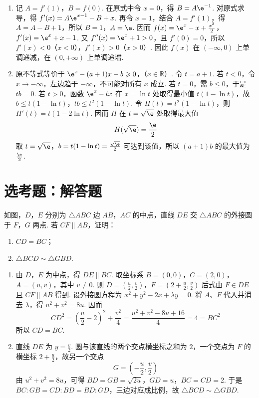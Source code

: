\begin{solution}
\begin{enumerate}
\item 记 \(A=f'(1)\)，\(B=f(0)\). 在原式中令 \(x=0\)，得 \(B=A\e^{-1}\). 对原式求导，得 \(f'(x)=A\e^{x-1}-B+x\). 再令 \(x=1\)，结合 \(A=f'(1)\)，得 \(A=A-B+1\)，所以 \(B=1\)，\(A=\e\). 因而
\(f(x)=\e^x-x+\frac{x^2}{2}\)，\(f'(x)=\e^x+x-1\).
又 \(f''(x)=\e^x+1>0\)，且 \(f'(0)=0\)，所以 \(f'(x)<0\)（\(x<0\)），\(f'(x)>0\)（\(x>0\)）. 因此 \(f(x)\) 在 \((-\infty,0)\) 上单调递减，在 \((0,+\infty)\) 上单调递增.
\item 原不等式等价于
\(\e^x-(a+1)x-b\geqslant0\)，（\(x\in\mathbb R\)）.
令 \(t=a+1\). 若 \(t<0\)，令 \(x\to-\infty\)，左边趋于 \(-\infty\)，不可能对所有 \(x\) 成立. 若 \(t=0\)，需 \(b\leqslant0\)，于是 \(tb=0\). 若 \(t>0\)，函数 \(\e^x-tx\) 在 \(x=\ln t\) 处取得最小值 \(t(1-\ln t)\)，故
\(b\leqslant t(1-\ln t)\)，\(tb\leqslant t^2(1-\ln t)\).
令 \(H(t)=t^2(1-\ln t)\)，则 \(H'(t)=t(1-2\ln t)\). 因而 \(H\) 在 \(t=\sqrt{\e}\) 处取得最大值
\[
H(\sqrt{\e})=\frac{\e}{2}
\]
取 \(t=\sqrt{\e}\)，\(b=t(1-\ln t)=\frac{\sqrt{\e}}2\) 可达到该值，所以 \((a+1)b\) 的最大值为 \(\frac{\e}{2}\).
\end{enumerate}
\end{solution}

\section{选考题：解答题}

\begin{problem}
如图，\(D\)，\(E\) 分别为 \(\triangle ABC\) 边 \(AB\)，\(AC\) 的中点，直线 \(DE\) 交 \(\triangle ABC\) 的外接圆于 \(F\)，\(G\) 两点. 若 \(CF \parallel AB\)，证明：

\begin{enumerate}
\item \(CD = BC\)；
\item \(\triangle BCD \sim \triangle GBD\).
\end{enumerate}
\end{problem}

\begin{solution}
\begin{enumerate}
\item 由 \(D\)，\(E\) 为中点，得 \(DE\parallel BC\). 取坐标系 \(B=(0,0)\)，\(C=(2,0)\)，\(A=(u,v)\)，其中 \(v\ne0\). 则
\(D=\left(\frac u2,\frac v2\right)\)，\(F=\left(2+\frac u2,\frac v2\right)\)
后式由 \(F\in DE\) 且 \(CF\parallel AB\) 得到. 设外接圆方程为 \(x^2+y^2-2x+\lambda y=0\). 将 \(A\)、\(F\) 代入并消去 \(\lambda\)，得 \(u^2+v^2=8u\). 因而
\[
CD^2=\left(\frac u2-2\right)^2+\frac{v^2}{4}
=\frac{u^2+v^2-8u+16}{4}=4=BC^2
\]
所以 \(CD=BC\).
\item 直线 \(DE\) 为 \(y=\frac{v}{2}\). 圆与该直线的两个交点横坐标之和为 \(2\)，一个交点为 \(F\) 的横坐标 \(2+\frac{u}{2}\)，故另一个交点
\[
G=\left(-\frac u2,\frac v2\right)
\]
由 \(u^2+v^2=8u\)，可得
\(BD=GB=\sqrt{2u}\)，\(GD=u\)，\(BC=CD=2\).
于是 \(BC:GB=CD:BD=BD:GD\)，三边对应成比例，故 \(\triangle BCD\sim\triangle GBD\).
\end{enumerate}
\end{solution}

